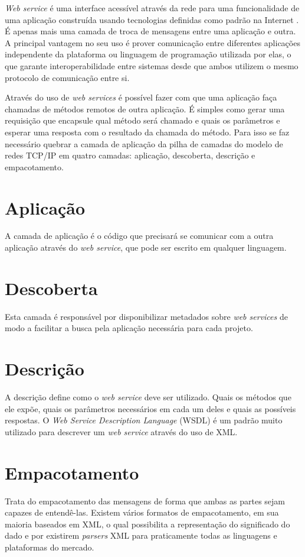 \label{Cap:web_services}

\textit{Web service} é uma interface acessível através da rede para uma funcionalidade de uma aplicação construída usando tecnologias definidas como padrão na Internet \cite{ref-oreilly-soap}. É apenas mais uma camada de troca de mensagens entre uma aplicação e outra. A principal vantagem no seu uso é prover comunicação entre diferentes aplicações independente da plataforma ou linguagem de programação utilizada por elas, o que garante interoperabilidade entre sistemas desde que ambos utilizem o mesmo protocolo de comunicação entre si.

Através do uso de \textit{web services} é possível fazer com que uma aplicação faça chamadas de métodos remotos de outra aplicação. É simples como gerar uma requisição que encapsule qual método será chamado e quais os parâmetros e esperar uma resposta com o resultado da chamada do método. Para isso se faz necessário quebrar a camada de aplicação da pilha de camadas do modelo de redes TCP/IP em quatro camadas: aplicação, descoberta, descrição e empacotamento.

\section{Aplicação}

A camada de aplicação é o código que precisará se comunicar com a outra aplicação através do \textit{web service}, que pode ser escrito em qualquer linguagem.

\section{Descoberta}

Esta camada é responsável por disponibilizar metadados sobre \textit{web services} de modo a facilitar a busca pela aplicação necessária para cada projeto.

\section{Descrição}

A descrição define como o \textit{web service} deve ser utilizado. Quais os métodos que ele expõe, quais os parâmetros necessários em cada um deles e quais as possíveis respostas. O \textit{Web Service Description Language} (WSDL) é um padrão muito utilizado para descrever um \textit{web service} através do uso de XML.

\section{Empacotamento}

Trata do empacotamento das mensagens de forma que ambas as partes sejam capazes de entendê-las. Existem vários formatos de empacotamento, em sua maioria baseados em XML, o qual possibilita a representação do significado do dado e por existirem \textit{parsers} XML para praticamente todas as linguagens e plataformas do mercado.



